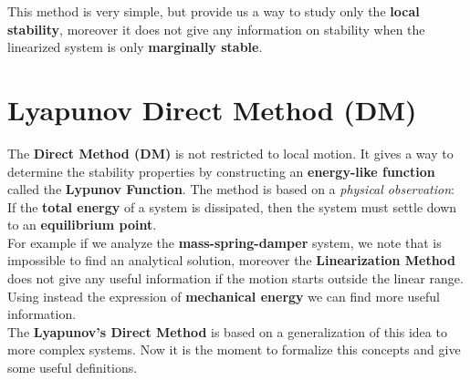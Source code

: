This method is very simple, but provide us a way to study only the \textbf{local stability}, moreover it does not give any information on stability when the linearized system is only \textbf{marginally stable}.

\section{Lyapunov Direct Method (DM)}
The \textbf{Direct Method (DM)} is not restricted to local motion. It gives a way to determine the stability properties by constructing an \textbf{energy-like function} called the \textbf{Lypunov Function}. The method is based on a \textit{physical observation}: \\

{
\Large{
\centering 
    If the \textbf{total energy} of a system is dissipated, then the  system must settle down to an \textbf{equilibrium point}. 
 }
}\\

For example if we analyze the \textbf{mass-spring-damper} system, we note that is impossible to find an analytical solution, moreover the \textbf{Linearization Method} does not give any useful information if the motion starts outside the linear range. Using instead the expression of \textbf{mechanical energy} we can find more useful information.\\
The \textbf{Lyapunov's Direct Method} is based on a generalization of this idea to more complex systems. Now it is the moment to formalize this concepts and give some useful definitions. \\

\hspace*{-5mm}
%



